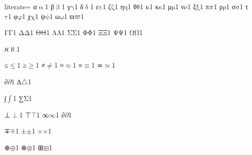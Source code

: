 {%
literate=
{α}{{\ensuremath{\mathrm{\upalpha}}}}1
{β}{{\ensuremath{\mathrm{\upbeta}}}}1
{γ}{{\ensuremath{\mathrm{\gamma}}}}1
{δ}{{\ensuremath{\mathrm{\updelta}}}}1
{ε}{{\ensuremath{\mathrm{\varepsilon}}}}1
{ζ}{{\ensuremath{\mathrm{\zeta}}}}1
{η}{{\ensuremath{\mathrm{\eta}}}}1
{θ}{{\ensuremath{\mathrm{\theta}}}}1
{ι}{{\ensuremath{\mathrm{\iota}}}}1
{κ}{{\ensuremath{\mathrm{\kappa}}}}1
{μ}{{\ensuremath{\mathrm{\mu}}}}1
{ν}{{\ensuremath{\mathrm{\nu}}}}1
{ξ}{{\ensuremath{\mathrm{\xi}}}}1
{π}{{\ensuremath{\mathrm{\mathnormal{\pi}}}}}1
{ρ}{{\ensuremath{\mathrm{\rho}}}}1
{σ}{{\ensuremath{\mathrm{\sigma}}}}1
{τ}{{\ensuremath{\mathrm{\tau}}}}1
{φ}{{\ensuremath{\mathrm{\varphi}}}}1
{χ}{{\ensuremath{\mathrm{\chi}}}}1
{ψ}{{\ensuremath{\mathrm{\psi}}}}1
{ω}{{\ensuremath{\mathrm{\omega}}}}1
{ϖ}{{\ensuremath{\mathrm{\mathnormal{\varpi}}}}}1 %

{Γ}{{\ensuremath{\mathrm{\Gamma}}}}1
{Δ}{{\ensuremath{\mathrm{\Delta}}}}1
{Θ}{{\ensuremath{\mathrm{\Theta}}}}1
{Λ}{{\ensuremath{\mathrm{\Lambda}}}}1
{Σ}{{\ensuremath{\mathrm{\Sigma}}}}1
{Φ}{{\ensuremath{\mathrm{\Phi}}}}1
{Ξ}{{\ensuremath{\mathrm{\Xi}}}}1
{Ψ}{{\ensuremath{\mathrm{\Psi}}}}1
{Ω}{{\ensuremath{\mathrm{\Omega}}}}1

{ℵ}{{\ensuremath{\aleph}}}1

{≤}{{\color{symbolcolor}\ensuremath{\leq}}}1
{≥}{{\color{symbolcolor}\ensuremath{\geq}}}1
{≠}{{\color{symbolcolor}\ensuremath{\neq}}}1
{≈}{{\color{symbolcolor}\ensuremath{\approx}}}1
{≡}{{\color{symbolcolor}\ensuremath{\equiv}}}1
{≃}{{\color{symbolcolor}\ensuremath{\simeq}}}1

{∂}{{\color{symbolcolor}\ensuremath{\partial}}}1
{∆}{{\color{symbolcolor}\ensuremath{\triangle}}}1 %

{∫}{{\color{symbolcolor}\ensuremath{\int}}}1
{∑}{{\color{symbolcolor}\ensuremath{\mathrm{\Sigma}}}}1

{⊥}{{\color{symbolcolor}\ensuremath{\perp}}}1
{⊤}{{\color{symbolcolor}\ensuremath{\top}}}1
{∞}{{\color{symbolcolor}\ensuremath{\infty}}}1
{∂}{{\color{symbolcolor}\ensuremath{\partial}}}1

{∓}{{\color{symbolcolor}\ensuremath{\mp}}}1
{±}{{\color{symbolcolor}\ensuremath{\pm}}}1
{×}{{\color{symbolcolor}\ensuremath{\times}}}1

{⊕}{{\color{symbolcolor}\ensuremath{\oplus}}}1
{⊗}{{\color{symbolcolor}\ensuremath{\otimes}}}1
{⊞}{{\color{symbolcolor}\ensuremath{\boxplus}}}1

}
